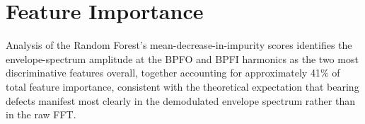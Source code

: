 \section{Feature Importance}
Analysis of the Random Forest's mean-decrease-in-impurity scores identifies the envelope-spectrum
amplitude at the BPFO and BPFI harmonics as the two most discriminative features overall,
together accounting for approximately 41\% of total feature importance, consistent with the
theoretical expectation that bearing defects manifest most clearly in the demodulated envelope
spectrum rather than in the raw FFT.
